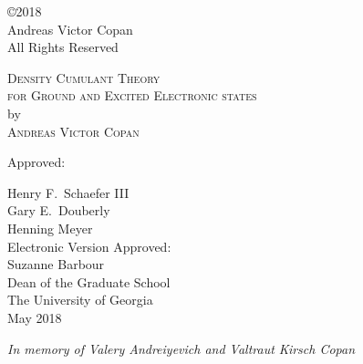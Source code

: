 \documentclass[12pt,notitlepage]{report}
\newcommand{\dissertationtitle}{%
    Density Cumulant Theory\\for Ground and Excited Electronic states}
\newcommand{\whoami}{Andreas Victor Copan}
\begin{document}
\newpage
\thispagestyle{empty}
\vspace*{5.5in}
\begin{center}
\copyright 2018 \\
\whoami \\
All Rights Reserved
\end{center}

\newpage
\thispagestyle{empty}
\vspace*{18pt}
\begin{center}
\textsc{\large{\dissertationtitle}}\\[18pt]
by\\[18pt]
\textsc{\whoami}
\end{center}
\vfill
\begin{flushleft}\singlespacing
\hskip 200pt {Approved:}\\
\vspace{12pt}

\hspace*{200pt}Henry F.~Schaefer III\\
\vspace{12pt}
\hspace*{200pt}Gary E.~Douberly\\
\hspace*{200pt}\makebox[100pt][l]{}Henning Meyer\\
\vfill
Electronic Version Approved:\\[12pt]
Suzanne Barbour\\
Dean of the Graduate School\\
The University of Georgia\\
May 2018
\end{flushleft}

\newpage
\vspace*{1.5in}
\begin{center}
\emph{In memory of Valery Andreiyevich and Valtraut Kirsch Copan}\\
\vspace{6pt}
\end{center}

%

\tableofcontents
\clearpage
{}


\nocite{Copan:2014p2389}






\newpage


\end{document}
